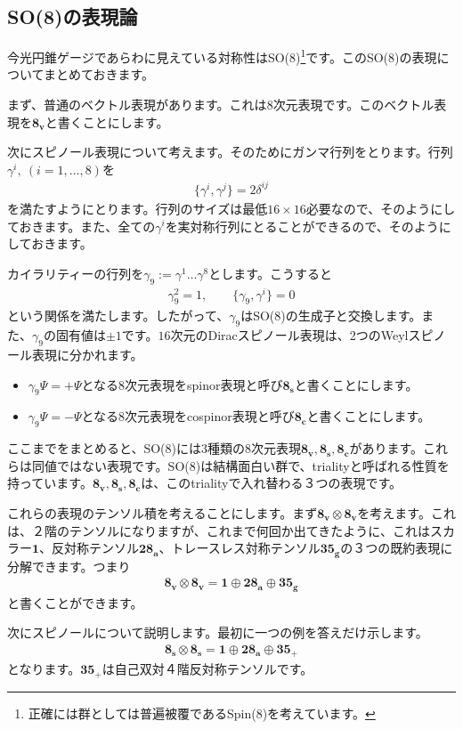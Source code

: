 \documentclass[report,paper=a4, fontsize=12pt, line_length=16cm, number_of_lines=33,dvipdfmx]{jlreq}
\numberwithin{equation}{chapter}
\numberwithin{equation}{section}
\newcommand{\triv}{\mathbf{1}}
\newcommand{\etv}{\mathbf{8_v}}
\newcommand{\ets}{\mathbf{8_s}}
\newcommand{\etc}{\mathbf{8_c}}
\newcommand{\tweta}{\mathbf{28_{a}}}
\newcommand{\thfvg}{\mathbf{35_{g}}}
\newcommand{\thfvp}{\mathbf{35}_{+}}
\begin{document}
\subsection{SO(8)の表現論}
今光円錐ゲージであらわに見えている対称性はSO(8)\footnote{正確には群としては普遍被覆であるSpin(8)を考えています。}です。このSO(8)の表現についてまとめておきます。

まず、普通のベクトル表現があります。これは$8$次元表現です。このベクトル表現を$\etv$と書くことにします。

次にスピノール表現について考えます。そのためにガンマ行列をとります。行列$\gamma^{i},\ (i=1,\dots,8)$を
\begin{align}
  \{\gamma^{i},\gamma^{j}\}=2\delta^{ij}
\end{align}
を満たすようにとります。行列のサイズは最低$16\times 16$必要なので、そのようにしておきます。また、全ての$\gamma^{i}$を実対称行列にとることができるので、そのようにしておきます。

カイラリティーの行列を$\gamma_9:=\gamma^{1}\dots \gamma^{8}$とします。こうすると
\begin{align}
  \gamma_9^{2}=1,\qquad \{\gamma_9,\gamma^{i}\}=0
\end{align}
という関係を満たします。したがって、$\gamma_9$はSO(8)の生成子と交換します。また、$\gamma_9$の固有値は$\pm 1$です。$16$次元のDiracスピノール表現は、2つのWeylスピノール表現に分かれます。
\begin{itemize}
  \item $\gamma_9\Psi = +\Psi$となる8次元表現をspinor表現と呼び$\ets$と書くことにします。
  \item $\gamma_9\Psi = -\Psi$となる8次元表現をcospinor表現と呼び$\etc$と書くことにします。
\end{itemize}

ここまでをまとめると、SO(8)には3種類の8次元表現$\etv,\ets,\etc$があります。これらは同値ではない表現です。SO(8)は結構面白い群で、trialityと呼ばれる性質を持っています。$\etv,\ets,\etc$は、このtrialityで入れ替わる３つの表現です。

これらの表現のテンソル積を考えることにします。まず$\etv\otimes\etv$を考えます。これは、２階のテンソルになりますが、これまで何回か出てきたように、これはスカラー$\triv$、反対称テンソル$\tweta$、トレースレス対称テンソル$\thfvg$の３つの既約表現に分解できます。つまり
\begin{align}
  \etv\otimes\etv=\triv \oplus \tweta\oplus \thfvg
\end{align}
と書くことができます。

次にスピノールについて説明します。最初に一つの例を答えだけ示します。
\begin{align}
  \ets\otimes\ets=\triv \oplus \tweta \oplus \thfvp
  \label{tensor8s8s}
\end{align}
となります。$\thfvp$は自己双対４階反対称テンソルです。
\end{document}
